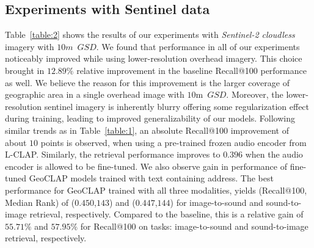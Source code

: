 \documentclass{bmvc2k}
\begin{document}
\subsection{Experiments with Sentinel data}
Table~\ref{table:2} shows the results of our experiments with \textit{Sentinel-2 cloudless} imagery with $10m$~$GSD$. We found that performance in all of our experiments noticeably improved while using lower-resolution overhead imagery. This choice brought in $12.89\%$ relative improvement in the baseline Recall@100 performance as well. We believe the reason for this improvement is the larger coverage of geographic area in a single overhead image with $10$m~$GSD$. Moreover, the lower-resolution sentinel imagery is inherently blurry offering some regularization effect during training, leading to improved generalizability of our models. Following similar trends as in Table~\ref{table:1}, an absolute Recall@100 improvement of about $10$ points is observed, when using a pre-trained frozen audio encoder from L-CLAP. Similarly, the retrieval performance improves to $0.396$ when the audio encoder is allowed to be fine-tuned. We also observe gain in performance of fine-tuned GeoCLAP models trained with text containing address. The best performance for GeoCLAP trained with all three modalities, yields (Recall@100, Median Rank) of ($0.450$,$143$) and ($0.447$,$144$) for image-to-sound and sound-to-image retrieval, respectively. Compared to the baseline, this is a relative gain of $55.71\%$ and $57.95\%$ for Recall@100 on tasks: image-to-sound and sound-to-image retrieval, respectively.
\end{document}
